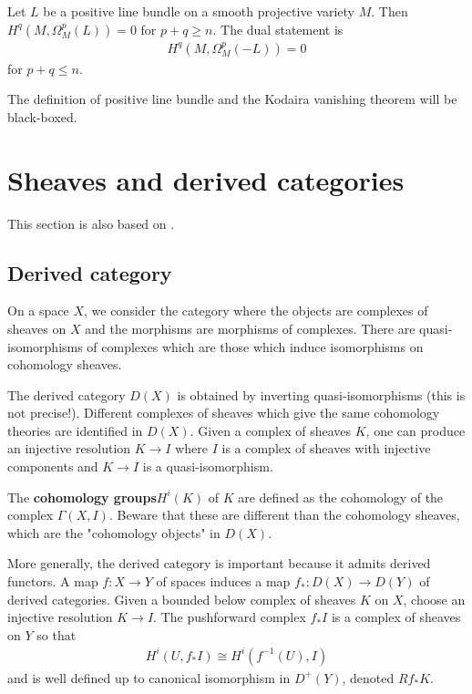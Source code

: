 \documentclass[12pt]{article}
\begin{document}
\begin{theorem}
     Let $L$ be a positive line bundle on a smooth projective variety $M$.
    Then $H^q(M,\Omega^p_M(L)) = 0$ for $p+q \geq n$. The dual statement is \begin{align*}
        H^q(M,\Omega^p_M(-L)) = 0
    \end{align*} for $p+q \leq n$.
\end{theorem}

\begin{remark}
    The definition of positive line bundle and the Kodaira vanishing theorem will be black-boxed.
\end{remark}

\section{Sheaves and derived categories}
This section is also based on \cite{cataldo-migliorini}.

\subsection{Derived category}
On a space $X$, we consider the category where the objects are 
complexes of sheaves on $X$ and the morphisms are morphisms of complexes.
There are quasi-isomorphisms of complexes which are those which induce isomorphisms on 
cohomology sheaves. 

\hfill

The derived category $D(X)$ is obtained by inverting quasi-isomorphisms (this is not precise!).
Different complexes of sheaves which give the same cohomology theories are identified in $D(X)$.
Given a complex of sheaves $K$, one can produce an injective resolution $K\to I$ where $I$ is a
complex of sheaves with injective components and $K\to I$ is a quasi-isomorphism. 

\begin{definition}
    The \textbf{cohomology 
groups}$H^i(K)$ of $K$ are defined as the cohomology of the complex $\Gamma(X,I)$.
Beware that these are different than
the cohomology sheaves, which are the "cohomology objects" in $D(X)$.
\end{definition}


\hfill

More generally, the derived category is important because it admits derived functors. A map 
$f:X\to Y$ of spaces induces a map $f_*:D(X)\to D(Y)$ of derived categories. Given 
a bounded below complex of sheaves $K$ on $X$, choose an injective resolution $K\to I$.
The pushforward complex $f_*I$ is a complex of sheaves on $Y$ so that \begin{align*}
    H^i(U,f_*I) \cong H^i(f^{-1}(U),I)
\end{align*}
and is well defined up to canonical isomorphism in $D^+(Y)$, denoted $Rf_*K$.
\end{document}
